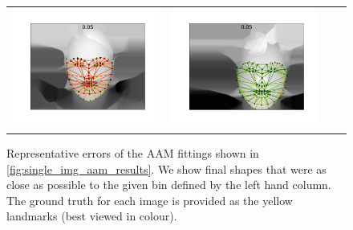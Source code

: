 \begin{figure}
{\begin{tabular}{cccc}
    \includegraphics[valign=m,scale=0.16]{statistical_normals/images/lk2d/aam_error_examples/normals_005_166}    &
    \includegraphics[valign=m,scale=0.16]{statistical_normals/images/lk2d/aam_error_examples/spherical_005_75}  \\
    \end{tabular}%
    }
    \caption{Representative errors of the AAM fittings shown in
             \cref{fig:single_img_aam_results}. We show final shapes that were
             as close as possible to the given bin defined by the left hand
             column. The ground truth for each image is provided as the yellow
             landmarks (best viewed in colour).}
\label{fig:aam-errors-examples}
\end{figure}
